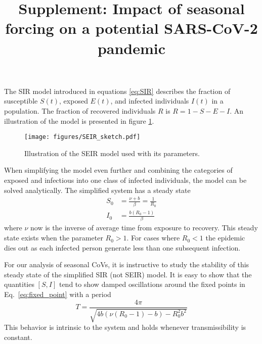 \documentclass[rmp, reprint, superscriptaddress, floatfix,amsmath]{revtex4-1}
\begin{document}
\title{Supplement: Impact of seasonal forcing on a potential SARS-CoV-2 pandemic}

\setcounter{figure}{0}
\renewcommand{\figurename}{Figure S}
\setcounter{table}{0}
\renewcommand{\tablename}{Table S}
\maketitle
The SIR model introduced in equations \ref{eq:SIR} describes the fraction of susceptible $S(t)$, exposed $E(t)$, and infected individuals $I(t)$ in a population. 
The fraction of recovered individuals $R$ is $R=1 - S - E - I$. 
An illustration of the model is presented in figure \ref{fig:schemeSIR}.

\begin{figure}[htb]
	\centering
	\texttt{[image: figures/SEIR\_sketch.pdf]}
	\caption{Illustration of the SEIR model used with its parameters.}\label{fig:schemeSIR}
\end{figure}



When simplifying the model even further and combining the categories of exposed and infectious into one class of infected individuals, the model can be solved analytically.
The simplified system has a steady state
\begin{equation}
\begin{split}
S_0 &= \frac{\nu + b}{\beta} = \frac{1}{R_0} \\
I_0 & = \frac{b(R_0-1)}{\beta}
\end{split}
\label{eq:fixed_point}
\end{equation}
where $\nu$ now is the inverse of average time from exposure to recovery.
This steady state exists when the parameter $R_0 > 1$. For cases where $R_0 < 1$ the epidemic dies out as each infected person generate less than one subsequent infection. 

For our analysis of seasonal CoVs, it is instructive to study the stability of this steady state of the simplified SIR (not SEIR) model. 
It is easy to show that the quantities $[S,I]$ tend to show damped oscillations around the fixed points in Eq.~\ref{eq:fixed_point} with a period
\begin{equation}
T = \frac{4\pi}{\sqrt{4b(\nu(R_0-1) - b) - R_0^2b^2}}
\label{eq:period}
\end{equation}
This behavior is intrinsic to the system and holds whenever transmissibility is constant.
\end{document}
